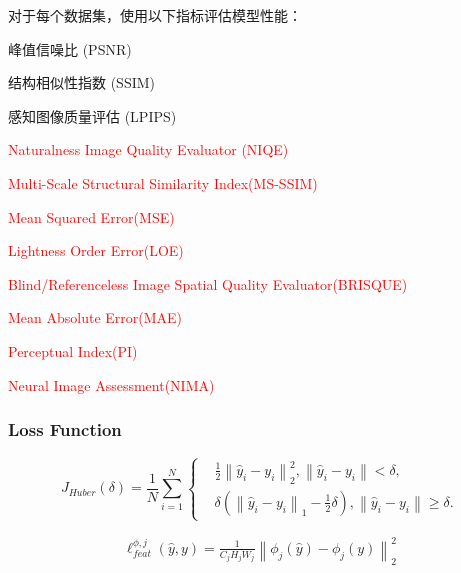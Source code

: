 \documentclass[a4paper, 10pt]{article}
\begin{document}
		对于每个数据集，使用以下指标评估模型性能：
		
		\begin{itemize}
			\item[$\bullet$]
			峰值信噪比 (PSNR)
			\item[$\bullet$]
			结构相似性指数 (SSIM)
			\item[$\bullet$]
			感知图像质量评估 (LPIPS)
			\textcolor{red}{
			\item[$\bullet$] 
			Naturalness Image Quality Evaluator (NIQE)
			\item[$\bullet$]
			Multi-Scale Structural Similarity Index(MS-SSIM)
			\item[$\bullet$]
			Mean Squared Error(MSE)
			\item[$\bullet$]
			Lightness Order Error(LOE)
			\item[$\bullet$]
			Blind/Referenceless Image Spatial Quality Evaluator(BRISQUE)
			\item[$\bullet$]
			Mean Absolute Error(MAE)
			\item[$\bullet$]
			Perceptual Index(PI)
			\item[$\bullet$]
			Neural Image Assessment(NIMA)
			}
		\end{itemize}
				
		\subsubsection{Loss Function}
		
		\begin{equation}
			J_{Huber}(\delta)= \frac{1}{N}\sum_{i=1}^{N}
			\left\{
			\begin{aligned}
				&\frac{1}{2}{\left\|\hat{y}_i - y_i \right\|}_2^{2}, \left\| \hat{y}_i -y_i \right\| < \delta , \\
				&\delta\left({\left\|\hat{y}_i - y_i \right\|}_1 - \frac{1}{2}\delta \right), \left\| \hat{y}_i -y_i \right\| \geq \delta.
			\end{aligned}
			\right.
			\label{eq: huber loss}
		\end{equation}
		
		\begin{equation}
			\begin{aligned}
				\ell_{feat}^{\phi,j} (\hat{y},y) = \frac{1}{C_{j}H_{j}W_{j}}{\left\| \phi_{j}(\hat{y})-\phi_{j}(y)\right\|}_{2}^2
			\end{aligned}
			\label{eq: perceptual loss}
		\end{equation}
		
\end{document}
